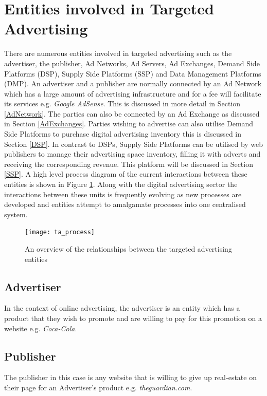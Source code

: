 \documentclass[12pt]{article}
\begin{document}
\pagebreak

\section{Entities involved in Targeted Advertising} \label{entities}
There are numerous entities involved in targeted advertising such as the advertiser, the publisher, Ad Networks, Ad Servers, Ad Exchanges, Demand Side Platforms (DSP), Supply Side Platforms (SSP) and Data Management Platforms (DMP). An advertiser and a publisher are normally connected by an Ad Network which has a large amount of advertising infrastructure and for a fee will facilitate its services e.g. \textit{Google AdSense}. This is discussed in more detail in Section \ref{AdNetwork}. The parties can also be connected by an Ad Exchange as discussed in Section \ref{AdExchanges}. Parties wishing to advertise can also utilise Demand Side Platforms to purchase digital advertising inventory this is discussed in Section \ref{DSP}. In contrast to DSPs, Supply Side Platforms can be utilised by web publishers to manage their advertising space inventory, filling it with adverts and receiving the corresponding revenue. This platform will be discussed in Section \ref{SSP}. A high level process diagram of the current interactions between these entities is shown in Figure \ref{fig:ta_process}. Along with the digital advertising sector the interactions between these units is frequently evolving as new processes are developed and entities attempt to amalgamate processes into one centralised system.

\begin{figure}[H]
    \centering
    \texttt{[image: ta\_process]}
    \caption{An overview of the relationships between the targeted advertising entities}
    \label{fig:ta_process}
\end{figure}

\subsection{Advertiser}
In the context of online advertising, the advertiser is an entity which has a product that they wish to promote and are willing to pay for this promotion on a website e.g. \textit{Coca-Cola}.

\subsection{Publisher} 
The publisher in this case is any website that is willing to give up real-estate on their page for an Advertiser's product e.g. \textit{theguardian.com}.
\end{document}
